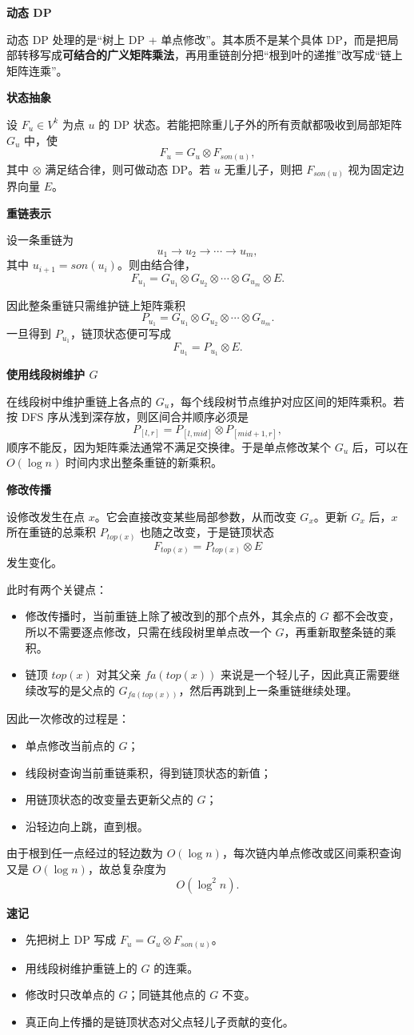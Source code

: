 \textbf{动态 DP}

动态 DP 处理的是“树上 DP + 单点修改”。其本质不是某个具体 DP，而是把局部转移写成\textbf{可结合的广义矩阵乘法}，再用重链剖分把“根到叶的递推”改写成“链上矩阵连乘”。

\textbf{状态抽象}

设 $F_u\in V^k$ 为点 $u$ 的 DP 状态。若能把除重儿子外的所有贡献都吸收到局部矩阵 $G_u$ 中，使
\[
F_u = G_u \otimes F_{son(u)},
\]
其中 $\otimes$ 满足结合律，则可做动态 DP。若 $u$ 无重儿子，则把 $F_{son(u)}$ 视为固定边界向量 $E$。

\textbf{重链表示}

设一条重链为
\[
u_1 \to u_2 \to \cdots \to u_m,
\]
其中 $u_{i+1}=son(u_i)$。则由结合律，
\[
F_{u_1}
=
G_{u_1}\otimes G_{u_2}\otimes \cdots \otimes G_{u_m}\otimes E.
\]

因此整条重链只需维护链上矩阵乘积
\[
P_{u_1}
=
G_{u_1}\otimes G_{u_2}\otimes \cdots \otimes G_{u_m}.
\]
一旦得到 $P_{u_1}$，链顶状态便可写成
\[
F_{u_1}=P_{u_1}\otimes E.
\]

\textbf{使用线段树维护 $G$}

在线段树中维护重链上各点的 $G_u$，每个线段树节点维护对应区间的矩阵乘积。若按 DFS 序从浅到深存放，则区间合并顺序必须是
\[
P_{[l,r]} = P_{[l,mid]}\otimes P_{[mid+1,r]},
\]
顺序不能反，因为矩阵乘法通常不满足交换律。于是单点修改某个 $G_u$ 后，可以在 $O(\log n)$ 时间内求出整条重链的新乘积。

\textbf{修改传播}

设修改发生在点 $x$。它会直接改变某些局部参数，从而改变 $G_x$。更新 $G_x$ 后，$x$ 所在重链的总乘积 $P_{top(x)}$ 也随之改变，于是链顶状态
\[
F_{top(x)}
=
P_{top(x)}\otimes E
\]
发生变化。

此时有两个关键点：

\begin{itemize}
	\item 修改传播时，当前重链上除了被改到的那个点外，其余点的 $G$ 都不会改变，所以不需要逐点修改，只需在线段树里单点改一个 $G$，再重新取整条链的乘积。
	\item 链顶 $top(x)$ 对其父亲 $fa(top(x))$ 来说是一个轻儿子，因此真正需要继续改写的是父点的 $G_{fa(top(x))}$，然后再跳到上一条重链继续处理。
\end{itemize}

因此一次修改的过程是：

\begin{itemize}
	\item 单点修改当前点的 $G$；
	\item 线段树查询当前重链乘积，得到链顶状态的新值；
	\item 用链顶状态的改变量去更新父点的 $G$；
	\item 沿轻边向上跳，直到根。
\end{itemize}

由于根到任一点经过的轻边数为 $O(\log n)$，每次链内单点修改或区间乘积查询又是 $O(\log n)$，故总复杂度为
\[
O(\log^2 n).
\]

\textbf{速记}

\begin{itemize}
	\item 先把树上 DP 写成 $F_u = G_u \otimes F_{son(u)}$。
	\item 用线段树维护重链上的 $G$ 的连乘。
	\item 修改时只改单点的 $G$；同链其他点的 $G$ 不变。
	\item 真正向上传播的是链顶状态对父点轻儿子贡献的变化。
\end{itemize}
